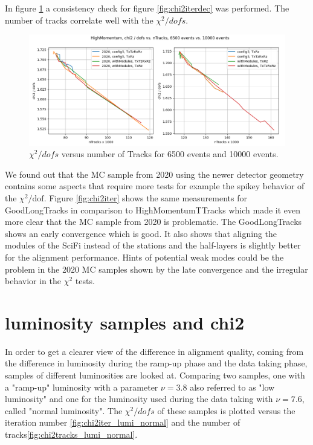 In figure \ref{fig:chi2tracksdec} a consistency check for figure
\ref{fig:chi2iterdec} was performed. The number of tracks correlate well with
the $\chi^2 / dofs$.

\begin{figure}
  \centering
  \includegraphics[width=\textwidth]{plots/LHCB_week_dec/chi2_vs_tracks_normal.png}
  \caption{$\chi^2 / dofs$ versus number of Tracks for 6500 events and 10000 events.}
  \label{fig:chi2tracksdec}
\end{figure}

We found out that the MC sample from 2020 using the newer detector geometry contains some aspects that require more tests for example the spikey behavior of the $\chi^2 / \text{dof}$. Figure \ref{fig:chi2iter} shows the same measurements for GoodLongTracks in comparison to HighMomentumTTracks which made it even more clear that the MC sample from 2020 is problematic. The GoodLongTracks shows an early convergence which is good. It also shows that aligning the modules of the SciFi instead of the stations and the half-layers is slightly better for the alignment performance. Hints of potential weak modes could be the problem in the 2020 MC samples shown by the late convergence and the irregular behavior in the $\chi^2$ tests.

\section{luminosity samples and chi2}
In order to get a clearer view of the difference in alignment quality, coming from the difference in luminosity during the ramp-up phase and the data taking phase, samples of different luminosities are looked at.
Comparing two samples, one with a "ramp-up" luminosity with a parameter $\nu = 3.8$ also referred to as "low luminosity" and one for the luminosity used during the data taking
with $\nu = 7.6$, called "normal luminosity".
The $\chi^2 / dofs$ of these samples is plotted versus the iteration number \ref{fig:chi2iter_lumi_normal} and the number of tracks\ref{fig:chi2tracks_lumi_normal}.

